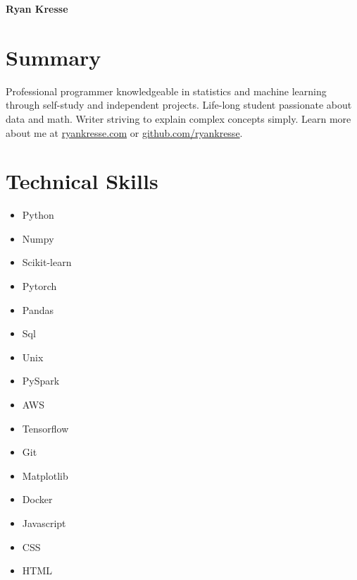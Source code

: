 \documentclass[11pt]{article}
\begin{document}
	
	\noindent \textbf{{\fontsize{38pt}{\parskip}\selectfont \color{RyanRed} Ryan Kresse}}
	\smallskip
	
	
	\section{Summary}
		Professional programmer knowledgeable in statistics and machine learning through self-study and independent projects.
		Life-long student passionate about data and math. Writer striving to explain complex concepts simply. Learn more about me at \href{http://ryankresse.com/blog}{ryankresse.com} or \href{https://github.com/ryankresse}{github.com/ryankresse}.  
	\begin{comment}
	\section{Contact and Links}
		\begin{itemize}[noitemsep]
			\item rkresse53@gmail.com
			\item ryankresse.com
			\item github.com/ryankresse
		\end{itemize}
	\end{comment}
	
	\section{Technical Skills}
		\begin{multicols}{4}
			\begin{itemize}
				\item Python 				
				\item Numpy 
				\item Scikit-learn 
				\item Pytorch
				\columnbreak
				
				\item Pandas 
				\item Sql 
				\item Unix 
				\item PySpark
				\columnbreak
				
				\item AWS
				\item Tensorflow 
				\item Git
				\item Matplotlib			
								 
							
				
				\columnbreak 
				\item Docker
				\item Javascript 
				\item CSS
				\item HTML 
				
				 				
				\columnbreak 
				
			\end{itemize}
		\end{multicols}
	
\end{document}
